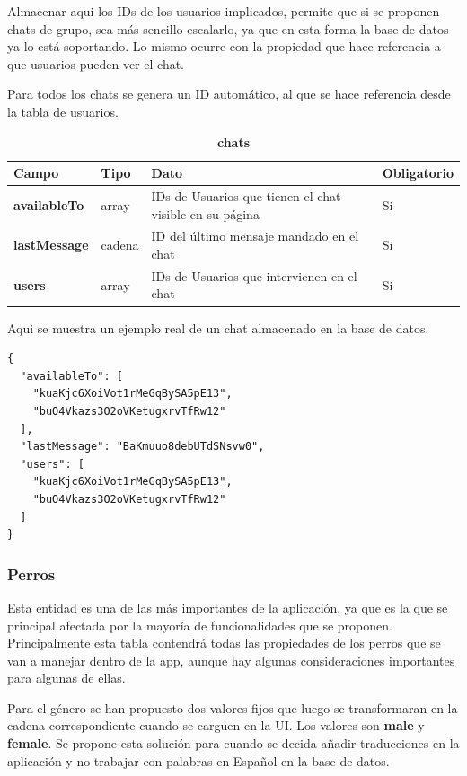 \documentclass[a4paper, 12pt]{article}
\begin{document}
Almacenar aqui los IDs de los usuarios implicados, permite que si se proponen chats de grupo, sea más sencillo escalarlo, ya que en esta forma la base de datos ya lo está soportando. Lo mismo ocurre con la propiedad que hace referencia a que usuarios pueden ver el chat. 

Para todos los chats se genera un ID automático, al que se hace referencia desde la tabla de usuarios.

\begin{table}[H]
\captionsetup{justification=raggedright,singlelinecheck=false}
\caption{\textbf{chats}}
\label{tab:chats}
	\begin{tabular}{|m{3cm}|m{2cm}|m{5cm}|m{3cm}|}
	\hline
	\textbf{Campo} & \textbf{Tipo} & \textbf{Dato} & \textbf{Obligatorio} \\ 
	\hline
	\textbf{availableTo} & array & IDs de Usuarios que tienen el chat visible en su página & Si \\ 
	\hline
	\textbf{lastMessage} & cadena & ID del último mensaje mandado en el chat & Si\\ 
	\hline
	\textbf{users} &  array & IDs de Usuarios que intervienen en el chat & Si \\ 
	\hline
\end{tabular}
\end{table}

Aqui se muestra un ejemplo real de un chat almacenado en la base de datos. 

\begin{verbatim}
{
  "availableTo": [
    "kuaKjc6XoiVot1rMeGqBySA5pE13",
    "buO4Vkazs3O2oVKetugxrvTfRw12"
  ],
  "lastMessage": "BaKmuuo8debUTdSNsvw0",
  "users": [
    "kuaKjc6XoiVot1rMeGqBySA5pE13",
    "buO4Vkazs3O2oVKetugxrvTfRw12"
  ]
}
\end{verbatim}

\subsubsection{Perros}

Esta entidad es una de las más importantes de la aplicación, ya que es la que se principal afectada por la mayoría de funcionalidades que se proponen. Principalmente esta tabla contendrá todas las propiedades de los perros que se van a manejar dentro de la app, aunque hay algunas consideraciones importantes para algunas de ellas. 

Para el género se han propuesto dos valores fijos que luego se transformaran en la cadena correspondiente cuando se carguen en la UI. Los valores son \textbf{male} y \textbf{female}. Se propone esta solución para cuando se decida añadir traducciones en la aplicación y no trabajar con palabras en Español en la base de datos.
\end{document}
